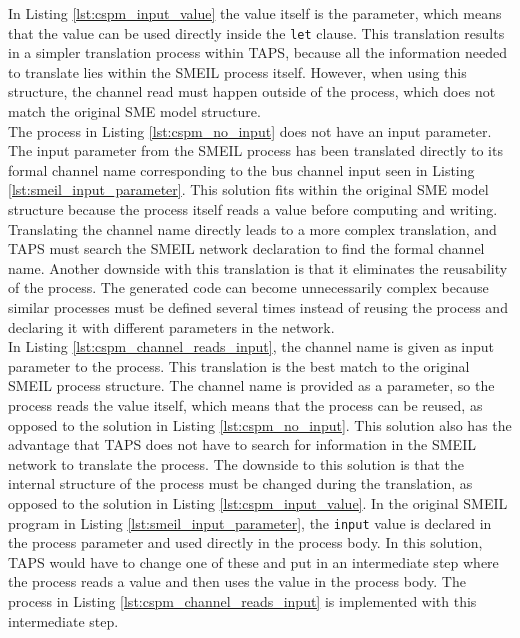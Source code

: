 In Listing \ref{lst:cspm_input_value} the value itself is the parameter, which means that the value can be used directly inside the \texttt{let} clause.
This translation results in a simpler translation process within TAPS, because all the information needed to translate lies within the SMEIL process itself. However, when using this structure, the channel read must happen outside of the process, which does not match the original SME model structure. \\

The \cspm{} process in Listing \ref{lst:cspm_no_input} does not have an input parameter. The input parameter from the SMEIL process has been translated directly to its formal channel name corresponding to the bus channel input seen in Listing \ref{lst:smeil_input_parameter}. This solution fits within the original SME model structure because the process itself reads a value before computing and writing. Translating the channel name directly leads to a more complex translation, and TAPS must search the SMEIL network declaration to find the formal channel name. Another downside with this translation is that it eliminates the reusability of the process. The generated code can become unnecessarily complex because similar processes must be defined several times instead of reusing the process and declaring it with different parameters in the network.\\

In Listing \ref{lst:cspm_channel_reads_input}, the channel name is given as input parameter to the \cspm{} process. This translation is the best match to the original SMEIL process structure. The channel name is provided as a parameter, so the process reads the value itself, which means that the process can be reused, as opposed to the solution in Listing \ref{lst:cspm_no_input}. This solution also has the advantage that TAPS does not have to search for information in the SMEIL network to translate the process.
The downside to this solution is that the internal structure of the process must be changed during the translation, as opposed to the solution in Listing \ref{lst:cspm_input_value}. In the original SMEIL program in Listing \ref{lst:smeil_input_parameter}, the \texttt{input} value is declared in the process parameter and used directly in the process body. In this solution, TAPS would have to change one of these and put in an intermediate step where the process reads a value and then uses the value in the process body. The process in Listing \ref{lst:cspm_channel_reads_input} is implemented with this intermediate step.\\

